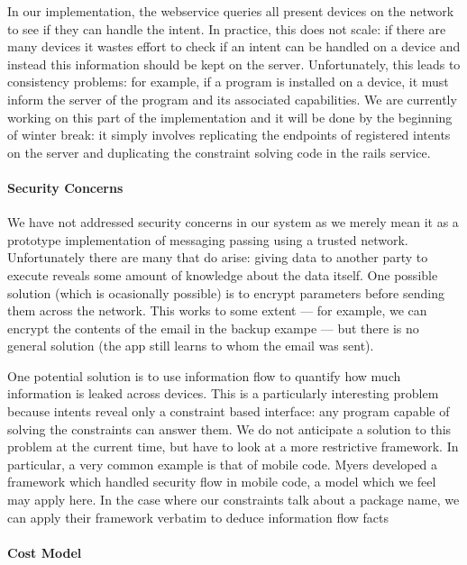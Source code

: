 \documentclass{acm_proc_article-sp}
\begin{document}
In our implementation, the webservice queries all present devices on
the network to see if they can handle the intent.  In practice, this
does not scale: if there are many devices it wastes effort to check if
an intent can be handled on a device and instead this information
should be kept on the server.  Unfortunately, this leads to
consistency problems: for example, if a program is installed on a
device, it must inform the server of the program and its associated
capabilities.  We are currently working on this part of the
implementation and it will be done by the beginning of winter break:
it simply involves replicating the endpoints of registered intents on
the server and duplicating the constraint solving code in the rails
service.

\paragraph{Security Concerns}

We have not addressed security concerns in our system as we merely
mean it as a prototype implementation of messaging passing using a
trusted network.  Unfortunately there are many that do arise: giving
data to another party to execute reveals some amount of knowledge
about the data itself.  One possible solution (which is ocasionally
possible) is to encrypt parameters before sending them across the
network.  This works to some extent --- for example, we can encrypt
the contents of the email in the backup exampe --- but there is no
general solution (the app still learns to whom the email was sent).

One potential solution is to use information flow to quantify how much
information is leaked across devices.  This is a particularly
interesting problem because intents reveal only a constraint based
interface: any program capable of solving the constraints can answer
them.  We do not anticipate a solution to this problem at the current
time, but have to look at a more restrictive framework.  In
particular, a very common example is that of mobile code.  Myers
\cite{myers:oakland2012} developed a framework which handled security
flow in mobile code, a model which we feel may apply here.  In the
case where our constraints talk about a package name, we can apply
their framework verbatim to deduce information flow facts

\paragraph{Cost Model}
\end{document}
